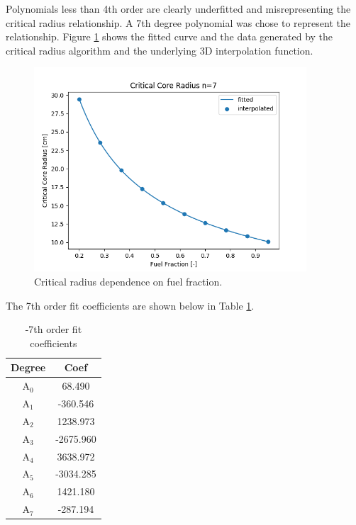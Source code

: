 Polynomials less than 4th order are clearly underfitted and misrepresenting the
critical radius relationship. A 7th degree polynomial was chose to represent the
relationship. Figure \ref{fig:core_r_co2_uo2} shows the fitted curve and the
data generated by the critical radius algorithm and the underlying 3D
interpolation function.

\begin{figure}[h]
    \centering
    \includegraphics[width=4in]{../images/uo2_co2_core_r.png}
\caption{Critical radius dependence on fuel fraction.}
\label{fig:core_r_co2_uo2}
\end{figure}

The 7th order fit coefficients are shown below in Table
\ref{tab:uo2_co2_fit_coeffs}.

\begin{table}[h]
  \centering
  \caption{\uox-\codiox 7th order fit coefficients}
  \begin{tabular}{cc}
    \toprule
     Degree & Coef\\ 
    \midrule                                  
    A$_0$  &  68.490\\
    A$_1$  &  -360.546\\
    A$_2$  &  1238.973\\
    A$_3$  &  -2675.960\\
    A$_4$  &  3638.972\\
    A$_5$  &  -3034.285\\
    A$_6$  &  1421.180\\
    A$_7$  &  -287.194\\
  \end{tabular}
  \label{tab:uo2_co2_fit_coeffs}
\end{table}

